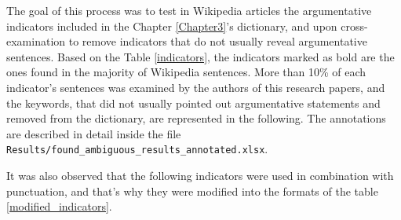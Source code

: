The goal of this process was to test in Wikipedia articles the argumentative indicators included in the Chapter \ref{Chapter3}'s dictionary, and upon cross-examination to remove indicators that do not usually reveal argumentative sentences. Based on the Table \ref{indicators}, the indicators marked as bold are the ones found in the majority of Wikipedia sentences. More than 10\% of each indicator's sentences was examined by the authors of this research papers, and the keywords, that did not usually pointed out argumentative statements and removed from the dictionary, are represented in the following. The annotations are described in detail inside the file \texttt{Results/found\_ambiguous\_results\_annotated.xlsx}.

\begin{table}[H]
	\centering
	\caption{Indicators found in Wikipedia articles} 
	\label{removed_indicators}
\end{table}

It was also observed that the following indicators were used in combination with punctuation, and that's why they were modified into the formats of the table \ref{modified_indicators}.

